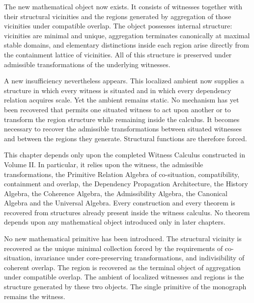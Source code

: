 \documentclass[12pt,anyside]{book}
\begin{document}
The new mathematical object now exists. It consists of witnesses together with their structural vicinities and the regions generated by aggregation of those vicinities under compatible overlap. The object possesses internal structure: vicinities are minimal and unique, aggregation terminates canonically at maximal stable domains, and elementary distinctions inside each region arise directly from the containment lattice of vicinities. All of this structure is preserved under admissible transformations of the underlying witnesses.

A new insufficiency nevertheless appears. This localized ambient now supplies a structure in which every witness is situated and in which every dependency relation acquires scale. Yet the ambient remains static. No mechanism has yet been recovered that permits one situated witness to act upon another or to transform the region structure while remaining inside the calculus. It becomes necessary to recover the admissible transformations between situated witnesses and between the regions they generate. Structural functions are therefore forced.

\begin{dependencyaudit}
This chapter depends only upon the completed Witness Calculus constructed in Volume II. In particular, it relies upon the witness, the admissible transformations, the Primitive Relation Algebra of co-situation, compatibility, containment and overlap, the Dependency Propagation Architecture, the History Algebra, the Coherence Algebra, the Admissibility Algebra, the Canonical Algebra and the Universal Algebra. Every construction and every theorem is recovered from structures already present inside the witness calculus. No theorem depends upon any mathematical object introduced only in later chapters.
\end{dependencyaudit}

\begin{primitiveaudit}
No new mathematical primitive has been introduced. The structural vicinity is recovered as the unique minimal collection forced by the requirements of co-situation, invariance under core-preserving transformations, and indivisibility of coherent overlap. The region is recovered as the terminal object of aggregation under compatible overlap. The ambient of localized witnesses and regions is the structure generated by these two objects. The single primitive of the monograph remains the witness.
\end{primitiveaudit}
\end{document}
